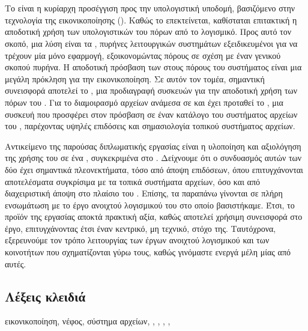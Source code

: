 \chapter*{\abstractname}

Το  είναι η κυρίαρχη προσέγγιση προς την υπολογιστική
υποδομή, βασιζόμενο στην τεχνολογία της εικονικοποίησης ().
Καθώς το  επεκτείνεται, καθίσταται επιτακτική η αποδοτική χρήση των
υπολογιστικών του πόρων από το λογισμικό. Προς αυτό τον σκοπό, μια λύση είναι τα
\emph{}, πυρήνες λειτουργικών συστημάτων εξειδικευμένοι για να
τρέχουν μία μόνο εφαρμογή, εξοικονομώντας πόρους σε σχέση με έναν γενικού σκοπού
πυρήνα. Η αποδοτική πρόσβαση των  στους πόρους του
\host{} συστήματος είναι μια μεγάλη πρόκληση για την εικονικοποίηση. Σε αυτόν
τον τομέα, σημαντική συνεισφορά αποτελεί το \emph{}, μια προδιαγραφή
 συσκευών για την αποδοτική χρήση των πόρων του \host{}.
Για το διαμοιρασμό αρχείων ανάμεσα σε \host{} και \guest{} έχει προταθεί το
\emph{\viofs{}}, μια  συσκευή που προσφέρει στον \guest{} πρόσβαση σε
έναν κατάλογο του συστήματος αρχείων του \host{}, παρέχοντας υψηλές επιδόσεις
και σημασιολογία τοπικού συστήματος αρχείων.

Αντικείμενο της παρούσας διπλωματικής εργασίας είναι η υλοποίηση και αξιολόγηση
της χρήσης του \viofs{} σε ένα , συγκεκριμένα στο \osv{}.
Δείχνουμε ότι ο συνδυασμός αυτών των δύο έχει σημαντικά πλεονεκτήματα, τόσο από
άποψη επιδόσεων, όπου επιτυγχάνονται αποτελέσματα συγκρίσιμα με τα τοπικά
συστήματα αρχείων, όσο και από διαχειριστική άποψη στο πλαίσιο του .
Επίσης, τα παραπάνω γίνονται σε πλήρη ενσωμάτωση με το έργο ανοιχτού λογισμικού
του  στο οποίο βασιστήκαμε. Έτσι, το προϊόν της εργασίας αποκτά
πρακτική αξία, καθώς αποτελεί χρήσιμη συνεισφορά στο έργο, επιτυγχάνοντας έτσι
έναν κεντρικό, μη τεχνικό, στόχο της. Ταυτόχρονα, εξερευνούμε τον τρόπο
λειτουργίας των έργων ανοιχτού λογισμικού και των κοινοτήτων που σχηματίζονται
γύρω τους, καθώς γινόμαστε ενεργά μέλη μίας από αυτές.

\section*{Λέξεις κλειδιά}

\noindent
εικονικοποίηση, νέφος, σύστημα αρχείων, , , \osv{},
\viofs{}, \qemu{}
